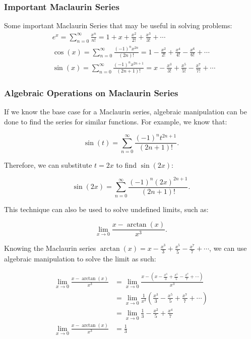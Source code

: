 \documentclass[12pt]{article}
\begin{document}
\subsubsection{Important Maclaurin Series}
\noindent Some important Maclaurin Series that may be useful in solving problems:
\begin{align*}
     & e^x = \sum_{n=0}^\infty \frac{x^n}{n!} = 1 + x + \frac{x^2}{2!} + \frac{x^3}{3!} + \cdots                                   \\[6pt]
     & \cos(x) = \sum_{n=0}^\infty \frac{(-1)^n x^{2n}}{(2n)!} = 1 - \frac{x^2}{2!} + \frac{x^4}{4!} - \frac{x^6}{6!} + \cdots     \\[6pt]
     & \sin(x) = \sum_{n=0}^\infty \frac{(-1)^n x^{2n+1}}{(2n+1)!} = x - \frac{x^3}{3!} + \frac{x^5}{5!} - \frac{x^7}{7!} + \cdots
\end{align*}

\subsubsection{Algebraic Operations on Maclaurin Series}

If we know the base case for a Maclaurin series, algebraic manipulation can be done to find the series for similar functions. For example, we know that:

\[ \sin(t) = \sum_{n=0}^\infty \frac{(-1)^n t^{2n+1}}{(2n+1)!}. \]

\noindent Therefore, we can substitute $t = 2x$ to find $\sin(2x)$:

\[ \sin(2x) = \sum_{n=0}^\infty \frac{(-1)^n (2x)^{2n+1}}{(2n+1)!}. \]

\noindent This technique can also be used to solve undefined limits, such as:

\[ \lim_{x \to 0} \frac{x - \arctan(x)}{x^3}. \]

Knowing the Maclaurin series $\arctan(x) = x - \frac{x^3}{3} + \frac{x^5}{5} - \frac{x^7}{7} + \cdots$, we can use algebraic manipulation to solve the limit as such:

\begin{align*}
    \lim_{x \to 0} \frac{x - \arctan(x)}{x^3} & = \lim_{x \to 0} \frac{x - \left( x - \frac{x^3}{3} + \frac{x^5}{5} - \frac{x^7}{7} + \cdots \right)}{x^3} \\[6pt]
                                              & = \lim_{x \to 0} \frac{1}{x^3} \left( \frac{x^3}{3} - \frac{x^5}{5} + \frac{x^7}{7} + \cdots \right)       \\[6pt]
                                              & = \lim_{x \to 0} \frac{1}{3} - \frac{x^2}{5} + \frac{x^4}{7}                                               \\[6pt]
    \lim_{x \to 0} \frac{x - \arctan(x)}{x^3} & = \frac{1}{3}
\end{align*}
\end{document}
